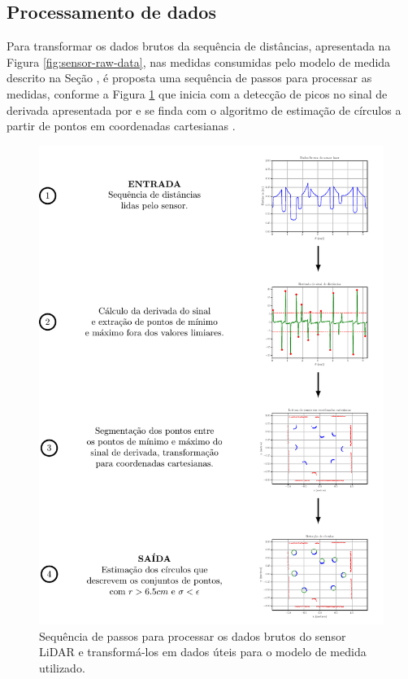 \subsection{Processamento de dados}
Para transformar os dados brutos da sequência de distâncias, apresentada na Figura 
\ref{fig:sensor-raw-data}, nas medidas consumidas pelo modelo de medida 
descrito na Seção \emph{}, é proposta uma sequência de passos para processar as medidas, conforme a Figura \ref{fig:lidar-data-processing-pipeline} que inicia com a detecção de picos 
no sinal de derivada apresentada por  e se finda com o  
algoritmo de estimação de círculos a partir de pontos em coordenadas 
cartesianas \cite[p.~903]{al2009error}.

\begin{figure}[]
  \includegraphics[width=\textwidth]{figs/data_processing_pipeline.pdf}
  \caption[Sequencia de passos de processamento do dado bruto do sensor LiDAR]{Sequência de passos para processar os dados brutos do sensor LiDAR e
  transformá-los em dados úteis para o modelo de medida utilizado.}
  \label{fig:lidar-data-processing-pipeline}
\end{figure}


